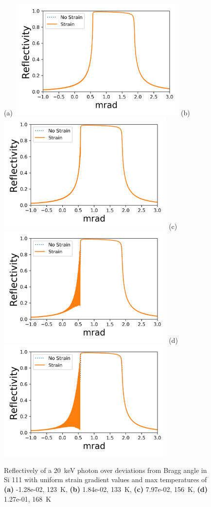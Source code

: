 \documentclass[preprint]{iucr}              %
\begin{document}
\begin{figure}
\caption{Reflectively of a 20~keV photon over deviations from Bragg angle in Si 111 with uniform strain gradient values and max temperatures of \textbf{(a)} -1.28e-02, 123~K, \textbf{(b)} 1.84e-02, 133~K, \textbf{(c)} 7.97e-02, 156~K, \textbf{(d)}  1.27e-01, 168~K}
(a)~\includegraphics[width = 8.85cm]{images/111_20keV_4.png}
(b)~\includegraphics[width = 8.85cm]{images/111_20keV_5.png}
(c)~\includegraphics[width = 8.85cm]{images/111_20keV_7.png}
(d)~\includegraphics[width = 8.85cm]{images/111_20keV_8.png}
\label{fig:111usg20kev}
\end{figure}
\end{document}
